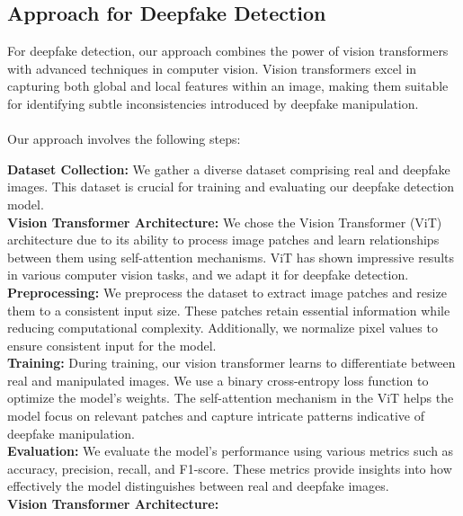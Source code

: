 \subsection{Approach for Deepfake Detection}

For deepfake detection, our approach combines the power of vision transformers with advanced techniques in computer vision. Vision transformers excel in capturing both global and local features within an image, making them suitable for identifying subtle inconsistencies introduced by deepfake manipulation.
\\
\\
Our approach involves the following steps:

\noindent\textbf{Dataset Collection:} We gather a diverse dataset comprising real and deepfake images. This dataset is crucial for training and evaluating our deepfake detection model.
\\

\noindent \textbf{Vision Transformer Architecture:} We chose the Vision Transformer (ViT) architecture due to its ability to process image patches and learn relationships between them using self-attention mechanisms. ViT has shown impressive results in various computer vision tasks, and we adapt it for deepfake detection.
\\

\noindent\textbf{Preprocessing:} We preprocess the dataset to extract image patches and resize them to a consistent input size. These patches retain essential information while reducing computational complexity. Additionally, we normalize pixel values to ensure consistent input for the model.
\\

\noindent\textbf{Training:} During training, our vision transformer learns to differentiate between real and manipulated images. We use a binary cross-entropy loss function to optimize the model's weights. The self-attention mechanism in the ViT helps the model focus on relevant patches and capture intricate patterns indicative of deepfake manipulation.
\\

\noindent\textbf{Evaluation:} We evaluate the model's performance using various metrics such as accuracy, precision, recall, and F1-score. These metrics provide insights into how effectively the model distinguishes between real and deepfake images.
\\
\newpage
\noindent\textbf{Vision Transformer Architecture:}

